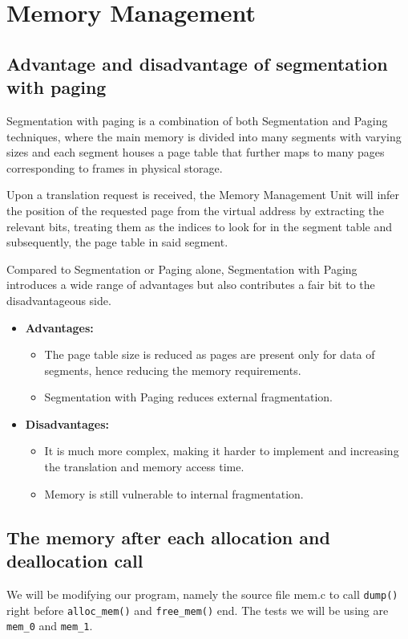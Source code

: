 \documentclass[a4paper]{article}
\numberwithin{equation}{section}
\begin{document}
\newpage
\section{Memory Management}
\subsection{Advantage and disadvantage of segmentation with paging}
Segmentation with paging is a combination of both Segmentation and Paging techniques, where the main memory is divided into many segments with varying sizes and each segment houses a page table that further maps to many pages corresponding to frames in physical storage.

Upon a translation request is received, the Memory Management Unit will infer the position of the requested page from the virtual address by extracting the relevant bits, treating them as the indices to look for in the segment table and subsequently, the page table in said segment.

Compared to Segmentation or Paging alone, Segmentation with Paging introduces a wide range of advantages but also contributes a fair bit to the disadvantageous side.

\begin{itemize}
  \item \textbf{Advantages:}
        \begin{itemize}
          \item The page table size is reduced as pages are present only for data of segments, hence reducing the memory requirements.
          \item Segmentation with Paging reduces external fragmentation.
        \end{itemize}
  \item \textbf{Disadvantages:}
        \begin{itemize}
          \item It is much more complex, making it harder to implement and increasing the translation and memory access time.
          \item Memory is still vulnerable to internal fragmentation.
        \end{itemize}
\end{itemize}

\subsection{The memory after each allocation and deallocation call}
We will be modifying our program, namely the source file mem.c to call \texttt{dump()} right before \texttt{alloc_mem()} and \texttt{free_mem()} end.
The tests we will be using are \texttt{mem_0} and \texttt{mem_1}.
\end{document}
